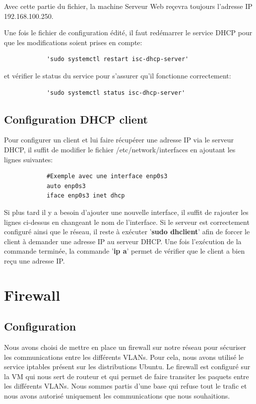 \documentclass[a4paper,12pt,openany]{report}
\begin{document}
            Avec cette partie du fichier, la machine Serveur Web reçevra toujours l'adresse IP 192.168.100.250.

            Une fois le fichier de configuration édité, il faut redémarrer le service DHCP pour que les modifications soient prises en compte:
            \begin{verbatim}
            'sudo systemctl restart isc-dhcp-server'
            \end{verbatim}
            et vérifier le status du service pour s'assurer qu'il fonctionne correctement:
            \begin{verbatim}
            'sudo systemctl status isc-dhcp-server'
            \end{verbatim}

            \subsection{Configuration DHCP client}
            Pour configurer un client et lui faire récupérer une adresse IP via le serveur DHCP, il suffit de modifier le fichier /etc/network/interfaces en ajoutant les lignes suivantes:
            \begin{verbatim}
            #Exemple avec une interface enp0s3
            auto enp0s3
            iface enp0s3 inet dhcp
            \end{verbatim}

            Si plus tard il y a besoin d'ajouter une nouvelle interface, il suffit de rajouter les lignes ci-dessus en changeant le nom de l'interface.
            Si le serveur est correctement configuré ainsi que le réseau, il reste à exécuter '\textbf{sudo dhclient}' afin de forcer le client à demander une adresse IP au serveur DHCP.
            Une fois l'exécution de la commande terminée, la commande '\textbf{ip a}' permet de vérifier que le client a bien reçu une adresse IP.

        \section{Firewall}
            \subsection{Configuration}
            Nous avons choisi de mettre en place un firewall sur notre réseau pour sécuriser les communications entre les différents VLANs. Pour cela, nous avons utilisé le service iptables présent sur les distributions Ubuntu.
            Le firewall est configuré sur la VM qui nous sert de routeur et qui permet de faire transiter les paquets entre les différents VLANs. Nous sommes partis d'une base qui refuse tout le trafic et nous avons autorisé uniquement les communications que nous souhaitions.
\end{document}
